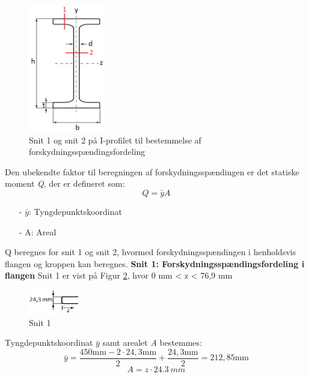 \begin{figure}[H]
	\centering
	\includegraphics[width=0.3\textwidth]{billeder/forskydningprofil.png}
	\caption{Snit 1 og snit 2 på I-profilet til bestemmelse af forskydningsspændingsfordeling}
	\label{fig:snitsnit}
\end{figure}

Den ubekendte faktor til beregningen af forskydningsspændingen er det statiske moment \textit{Q}, der er defineret som:
\begin{equation}
Q = \bar{y}A
\end{equation}
\begin{itemize}
	\item[-] $\bar{y}$: Tyngdepunktskoordinat
	\item[-] A: Areal
\end{itemize}

Q beregnes for snit 1 og snit 2, hvormed forskydningsspændingen i henholdsvis flangen og kroppen kan beregnes. 
\newline
\newline
\textbf{Snit 1: Forskydningsspændingsfordeling i flangen}
\newline
Snit 1 er vist på Figur \ref{fig:snitetforskyd}, hvor 0 mm < z < 76,9 mm

\begin{figure}[H]
	\centering
	\includegraphics[width=0.2\textwidth]{billeder/snitetforskydning.png}
	\caption{Snit 1}
	\label{fig:snitetforskyd}
\end{figure}

Tyngdepunktskoordinat $\bar{y}$ samt arealet \textit{A} bestemmes:
\begin{equation}
\bar{y} = \frac{450 \text{mm} - 2 \cdot 24,\!3 \text{mm}}{2} + \frac{24,\!3 \text{mm}}{2} = 212,\!85 \text{mm}
\end{equation}
\begin{equation}
A = z \cdot \SI{24,3}{mm}
\end{equation}

